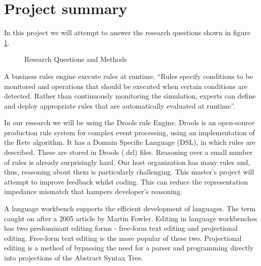 \section{Project summary}

In this project we will attempt to answer the research questions shown in figure \ref{fig:Research_Questions}.
\begin{figure}[H]
    \centering
    \caption{Research Questions and Methods}
    \label{fig:Research_Questions}
\end{figure}


A business rules engine execute rules at runtime. 
``Rules specify conditions to be monitored and operations that should be executed when certain conditions are detected.
Rather than continuously monitoring the simulation, experts can define and deploy appropriate rules that are automatically evaluated at runtime''\cite{liu2003dios++}. 

In our research we will be using the Drools rule Engine.
Drools\cite{browne2009jboss} is an open-source production rule system for complex event processing, using an implementation of the Rete algorithm\cite{forgy1989rete}.
It has a Domain Specific Language (DSL), in which rules are described.
These are stored in Drools (.drl) files. 
Reasoning over a small number of rules is already surprisingly hard.
Our host organization has many rules and, thus, reasoning about them is particularly challenging.
This master's project will attempt to improve feedback whilst coding.
This can reduce the representation impedance mismatch that hampers developer's reasoning.

A language workbench supports the efficient development of languages. 
The term caught on after a 2005 article by Martin Fowler\cite{Fowler_lwb}. 
Editing in language workbenches has two predominant editing forms - free-form text editing and projectional editing\cite{erdweg2013state}.
Free-form text editing is the more popular of these two.
Projectional editing is a method of bypassing the need for a parser and programming directly into projections of the Abstract Syntax Tree.

